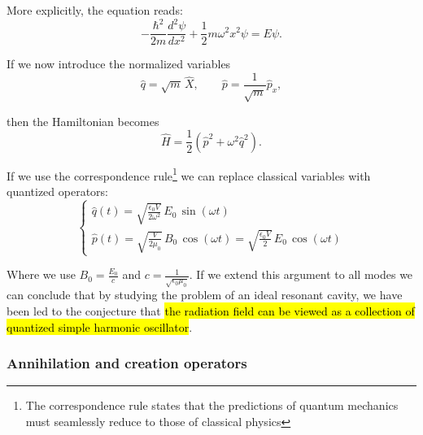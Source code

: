 More explicitly, the equation reads:
\begin{equation}\label{eqn:11-schrodinger-eq-harmonic-potential}
-\frac{\hbar^2}{2m}\frac{d^2\psi}{dx^2}+\frac12 m\omega^2x^2\psi=E\psi.
\end{equation}


If we now introduce the normalized variables
\begin{equation}\label{eqn:11-normalized-variables}
\hat q=\sqrt{m}\,\hat X,
\qquad
\hat p=\frac{1}{\sqrt{m}}\hat p_x,
\end{equation}

then the Hamiltonian becomes
\begin{equation}\label{eqn:11-harmonic-oscillator-hamiltonian-normalized}
\hat H=\frac12\left(\hat p^2+\omega^2\hat q^2\right).
\end{equation}


If we use the correspondence rule\footnote{The correspondence rule states that the predictions of quantum mechanics must seamlessly reduce to those of classical physics} we can replace classical variables with quantized operators:
\begin{equation}\label{eqn:11-quantized-field-operators}
    \begin{cases}
    \hat{q}(t) = \sqrt{\frac{\epsilon_0V}{2\omega^2}}\, E_0 \, \sin(\omega t)\\[1ex]
    \hat{p}(t) = \sqrt{\frac{V}{2\mu_0}}\, B_0 \, \cos(\omega t) =\sqrt{\frac{\epsilon_0V}{2}}\, E_0 \, \cos(\omega t)
\end{cases}
\end{equation}

Where we use $B_0 = \tfrac{E_0}{c}$ and $c = \tfrac{1}{\sqrt{\epsilon_0\mu_0}}$.
If we extend this argument to all modes we can conclude that by studying the problem of an ideal resonant cavity, we have been led to the conjecture that \hl{the radiation field can be viewed as a collection of quantized simple harmonic oscillator}.

\subsubsection{Annihilation and creation operators}

